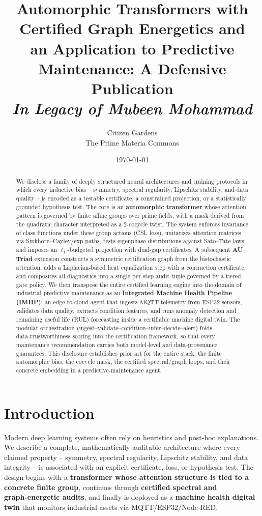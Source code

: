 \documentclass[12pt]{article}
\title{\bfseries Automorphic Transformers with Certified Graph Energetics and\\ an Application to Predictive Maintenance: A Defensive Publication \\ \Large\textit{In Legacy of Mubeen Mohammad}}
\author{Citizen Gardens \\ The Prime Materia Commons}
\date{\today}
\theoremstyle{plain}
\theoremstyle{definition}
\theoremstyle{remark}
\begin{document}
\maketitle

\begin{abstract}
We disclose a family of deeply structured neural architectures and training protocols in which every inductive bias -- symmetry, spectral regularity, Lipschitz stability, and data quality -- is encoded as a testable certificate, a constrained projection, or a statistically grounded hypothesis test. The core is an \textbf{automorphic transformer} whose attention pattern is governed by finite affine groups over prime fields, with a mask derived from the quadratic character interpreted as a $2$-cocycle twist. The system enforces invariance of class functions under these group actions (CSL loss), unitarizes attention matrices via Sinkhorn–Cayley/exp paths, tests eigenphase distributions against Sato--Tate laws, and imposes an $\ell_1$-budgeted projection with dual-gap certificates. A subsequent \textbf{AU--Triad} extension constructs a symmetric certification graph from the bistochastic attention, adds a Laplacian-based heat equalization step with a contraction certificate, and composites all diagnostics into a single per‑step audit tuple governed by a tiered gate policy. We then transpose the entire certified learning engine into the domain of industrial predictive maintenance as an \textbf{Integrated Machine Health Pipeline (IMHP)}: an edge‑to‑cloud agent that ingests MQTT telemetry from ESP32 sensors, validates data quality, extracts condition features, and runs anomaly detection and remaining useful life (RUL) forecasting inside a certifiable machine digital twin. The modular orchestration (ingest--validate--condition--infer--decide--alert) folds data‑trustworthiness scoring into the certification framework, so that every maintenance recommendation carries both model‑level and data‑provenance guarantees. This disclosure establishes prior art for the entire stack: the finite automorphic bias, the cocycle mask, the certified spectral/graph loops, and their concrete embedding in a predictive‑maintenance agent.
\end{abstract}

\section{Introduction}
Modern deep learning systems often rely on heuristics and post‑hoc explanations. We describe a complete, mathematically auditable architecture where every claimed property -- symmetry, spectral regularity, Lipschitz stability, and data integrity -- is associated with an explicit certificate, loss, or hypothesis test. The design begins with a \textbf{transformer whose attention structure is tied to a concrete finite group}, continues through \textbf{certified spectral and graph‑energetic audits}, and finally is deployed as a \textbf{machine health digital twin} that monitors industrial assets via MQTT/ESP32/Node‑RED.
\end{document}
